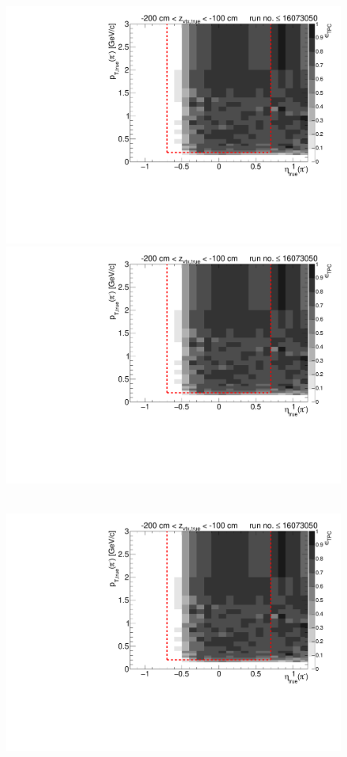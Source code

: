 \begin{figure}[hb]
{  \includegraphics[width=\linewidth,page=7]{graphics/eff/Eff2D_TPC_pion_Minus_RunRange1.pdf}\\
  \includegraphics[width=\linewidth,page=9]{graphics/eff/Eff2D_TPC_pion_Minus_RunRange1.pdf}
}~
\parbox{0.495\textwidth}{
  \centering
  \includegraphics[width=\linewidth,page=4]{graphics/eff/Eff2D_TPC_pion_Minus_RunRange1.pdf}\\
}
\end{figure}
